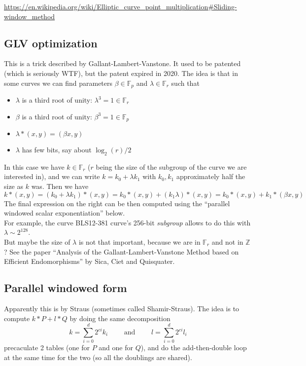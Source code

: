\documentclass[12pt,draft,a4paper,openany,oneside]{amsbook}
\def\F{\mathbb{F}}
\def\Z{\mathbb{Z}}
\theoremstyle{plain}
\theoremstyle{definition}
\begin{document}
\url{https://en.wikipedia.org/wiki/Elliptic_curve_point_multiplication#Sliding-window_method}


\subsection{GLV optimization}
This is a trick described by Gallant-Lambert-Vanstone. It used to be
patented (which is seriously WTF), but the patent expired in 2020.
The idea is that in some curves we can find parameters
$\beta\in\F_p$ and $\lambda\in\F_r$ such that 
\begin{itemize}
\item $\lambda$ is a third root of unity: $\lambda^3 =1 \in\F_r$ 
\item $\beta$ is a third root of unity: $\beta^3=1\in \F_p$ 
\item $\lambda * (x,y) = (\beta x, y)$
\item $\lambda$ has few bits, say about $\log_2(r)/2$
\end{itemize}
In this case we have $k\in \F_r$ ($r$ being the size of the subgroup
of the curve we are interested in), and we can write $k = k_0 + \lambda k_1$
with $k_0,k_1$ approximately half the size as $k$ was.
Then we have
\[ k*(x,y) = (k_0 + \lambda k_1)*(x,y) = k_0*(x,y) + (k_1\lambda)*(x,y)
= k_0*(x,y) + k_1*(\beta x,y) 
\]
The final expression on the right can be then computed 
using the ``parallel windowed scalar exponentiation'' below.\\

For example, the curve BLS12-381 curve's 256-bit \emph{subgroup} allows to do this
with $\lambda\sim 2^{128}$.\\

But maybe the size of $\lambda$ is not that important, because
we are in $\F_r$ and not in $\Z$? See the paper
``Analysis of the Gallant-Lambert-Vanstone
Method based on Efficient Endomorphisms''
by Sica, Ciet and Quisquater.


\subsection{Parallel windowed form}
Apparently this is by Straus (sometimes called Shamir-Straus). The idea is to 
compute $k*P + l*Q$ by doing the same decomposition 
\[ k=\sum_{i=0}^d 2^{ci}k_i \quad\quad \textrm{ and } \quad\quad 
   l=\sum_{i=0}^d 2^{ci}l_i
\]
precaculate 2 tables (one for $P$ and one for $Q$), and do the add-then-double
loop at the same time for the two (so all the doublings are shared).
\end{document}
